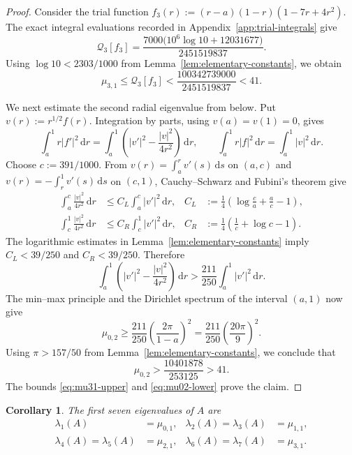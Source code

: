 \documentclass[11pt,letterpaper,reqno]{amsart}
\newtheorem{corollary}[corollary]{Corollary}
\theoremstyle{definition}
\newcommand{\dd}{\,\mathrm{d}}
\begin{document}
\begin{proof}
Consider the trial function
$f_3(r):=(r-a)(1-r)(1-7r+4r^2)$. The exact integral evaluations recorded in Appendix~\ref{app:trial-integrals} give
\[
 \mathcal{Q}_3[f_3]
 =\frac{7000\bigl(10^6\log 10+12031677\bigr)}{2451519837}.
\]
Using $\log 10<2303/1000$ from
Lemma~\ref{lem:elementary-constants}, we obtain
\begin{equation}\label{eq:mu31-upper}
 \mu_{3,1}\leq\mathcal{Q}_3[f_3]
 <\frac{100342739000}{2451519837}<41.
\end{equation}

We next estimate the second radial eigenvalue from below.  Put
$v(r):=r^{1/2}f(r)$.  Integration by parts, using $v(a)=v(1)=0$, gives
\[
 \int_a^1r|f'|^2\dd r
 =\int_a^1\left(|v'|^2-\frac{|v|^2}{4r^2}\right)\dd r,
 \qquad
 \int_a^1r|f|^2\dd r=\int_a^1|v|^2\dd r.
\]
Choose $c:=391/1000$.  From
$v(r)=\int_a^rv'(s)\dd s$ on $(a,c)$ and
$v(r)=-\int_r^1v'(s)\dd s$ on $(c,1)$, Cauchy--Schwarz and Fubini's theorem
give
\begin{align*}
 \int_a^c\frac{|v|^2}{4r^2}\dd r
 &\leq C_L\int_a^c|v'|^2\dd r,
 &C_L&:=\frac14\left(\log\frac ca+\frac ac-1\right),\\
 \int_c^1\frac{|v|^2}{4r^2}\dd r
 &\leq C_R\int_c^1|v'|^2\dd r,
 &C_R&:=\frac14\left(\frac1c+\log c-1\right).
\end{align*}
The logarithmic estimates in Lemma~\ref{lem:elementary-constants} imply
$C_L<39/250$ and $C_R<39/250$.  Therefore
\begin{equation}\label{eq:hardy-lower}
 \int_a^1\left(|v'|^2-\frac{|v|^2}{4r^2}\right)\dd r
 >\frac{211}{250}\int_a^1|v'|^2\dd r.
\end{equation}
The min--max principle and the Dirichlet spectrum of the interval $(a,1)$
now give
\[
 \mu_{0,2}\geq\frac{211}{250}
 \left(\frac{2\pi}{1-a}\right)^2
 =\frac{211}{250}\left(\frac{20\pi}{9}\right)^2.
\]
Using $\pi>157/50$ from Lemma~\ref{lem:elementary-constants}, we conclude
that
\begin{equation}\label{eq:mu02-lower}
 \mu_{0,2}>\frac{10401878}{253125}>41.
\end{equation}
The bounds \eqref{eq:mu31-upper} and \eqref{eq:mu02-lower} prove the claim.
\end{proof}

\begin{corollary}
The first seven eigenvalues of $A$ are
\begin{equation}\label{eq:low-annular-spectrum}
\begin{aligned}
 \lambda_1(A)&=\mu_{0,1},
 &\lambda_2(A)=\lambda_3(A)&=\mu_{1,1},\\
 \lambda_4(A)=\lambda_5(A)&=\mu_{2,1},
 &\lambda_6(A)=\lambda_7(A)&=\mu_{3,1}.
\end{aligned}
\end{equation}
\end{corollary}
\end{document}
